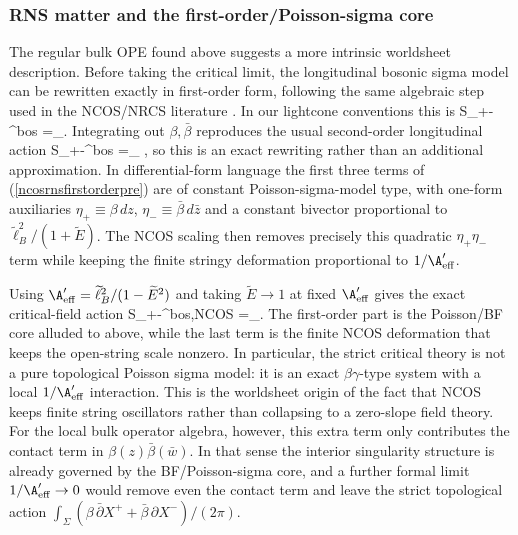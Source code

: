 \documentclass[12pt]{article}
\newcommand{\wt}[1]{\widetilde{#1}}
\begin{document}
\subsubsection{RNS matter and the first-order/Poisson-sigma core}
\noindent
The regular bulk OPE found above suggests a more intrinsic worldsheet description. Before taking the critical limit, the longitudinal bosonic sigma model can be rewritten exactly in first-order form, following the same algebraic step used in the NCOS/NRCS literature \cite{gomis2000nonrelativisticclosedstringtheory}. In our lightcone conventions this is
\ie\label{ncosrnsfirstorderpre}
S_{+-}^{\rm bos}
=\int_\left[
\beta\,\bar\partial X^+
+\bar\beta\,\partial X^-
-{2\wt\ell_B^2\over 1+\widetilde E}\,\beta\bar\beta
+{1-\widetilde E\over 2\wt\ell_B^2}\,\partial X^+\bar\partial X^-
\right].
\fe
Integrating out $\beta,\bar\beta$ reproduces the usual second-order longitudinal action
\ie
S_{+-}^{\rm bos}
=\int_\Sigma {d^2z\over 4\pi\wt\ell_B^2}
,
\fe
so this is an exact rewriting rather than an additional approximation. In differential-form language the first three terms of (\ref{ncosrnsfirstorderpre}) are of constant Poisson-sigma-model type, with one-form auxiliaries $\eta_+\equiv \beta\,dz$, $\eta_-\equiv \bar\beta\,d\bar z$ and a constant bivector proportional to $\wt\ell_B^2/(1+\widetilde E)$. The NCOS scaling then removes precisely this quadratic $\eta_+\eta_-$ term while keeping the finite stringy deformation proportional to $1/\A'_{\rm eff}$.

Using $\A'_{\rm eff}=\wt\ell_B^2/(1-\widetilde E^2)$ and taking $\widetilde E\to1$ at fixed $\A'_{\rm eff}$ gives the exact critical-field action
\ie\label{ncosrnsfirstordercrit}
S_{+-}^{\rm bos,NCOS}
=\int_.
\fe
The first-order part is the Poisson/BF core alluded to above, while the last term is the finite NCOS deformation that keeps the open-string scale nonzero. In particular, the strict critical theory is not a pure topological Poisson sigma model: it is an exact $\beta\gamma$-type system with a local $1/\A'_{\rm eff}$ interaction. This is the worldsheet origin of the fact that NCOS keeps finite string oscillators rather than collapsing to a zero-slope field theory. For the local bulk operator algebra, however, this extra term only contributes the contact term in $\beta(z)\bar\beta(\bar w)$. In that sense the interior singularity structure is already governed by the BF/Poisson-sigma core, and a further formal limit $1/\A'_{\rm eff}\to0$ would remove even the contact term and leave the strict topological action $\int_\Sigma (\beta\,\bar\partial X^+ + \bar\beta\,\partial X^-)/(2\pi)$.
\end{document}
